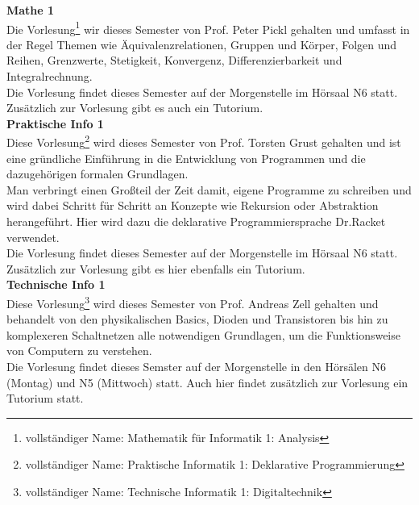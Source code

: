 
\pagebreak

\textbf{Mathe 1}\\[4mm]
Die Vorlesung\footnote{vollständiger Name: Mathematik für Informatik 1: Analysis} wir dieses Semester von Prof. Peter Pickl gehalten und umfasst in der Regel Themen wie Äquivalenzrelationen, Gruppen und Körper, Folgen und Reihen, Grenzwerte, Stetigkeit, Konvergenz, Differenzierbarkeit und Integralrechnung.\\
Die Vorlesung findet dieses Semester auf der Morgenstelle im Hörsaal N6 statt. Zusätzlich zur Vorlesung gibt es auch ein Tutorium.\\

\textbf{Praktische Info 1}\\[4mm]
Diese Vorlesung\footnote{vollständiger Name: Praktische Informatik 1: Deklarative Programmierung} wird dieses Semester von Prof. Torsten Grust gehalten und ist eine gründliche Einführung in die Entwicklung von Programmen und die dazugehörigen formalen Grundlagen.\\
Man verbringt einen Großteil der Zeit damit, eigene Programme zu schreiben und wird dabei Schritt für Schritt an Konzepte wie Rekursion oder Abstraktion herangeführt. Hier wird dazu die deklarative Programmiersprache Dr.Racket verwendet.\\
Die Vorlesung findet dieses Semester auf der Morgenstelle im Hörsaal N6 statt. Zusätzlich zur Vorlesung gibt es hier ebenfalls ein Tutorium.\\

\textbf{Technische Info 1}\\[4mm]
Diese Vorlesung\footnote{vollständiger Name: Technische Informatik 1: Digitaltechnik} wird dieses Semester von Prof. Andreas Zell gehalten und behandelt von den physikalischen Basics, Dioden und Transistoren bis hin zu komplexeren Schaltnetzen alle notwendigen Grundlagen, um die Funktionsweise von Computern zu verstehen.\\
Die Vorlesung findet dieses Semster auf der Morgenstelle in den Hörsälen N6 (Montag) und N5 (Mittwoch) statt. Auch hier findet zusätzlich zur Vorlesung ein Tutorium statt.


